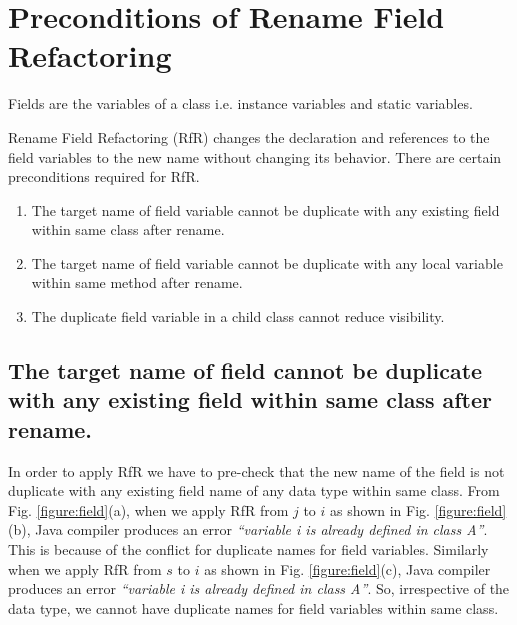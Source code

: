 \section{\textbf{Preconditions of Rename Field Refactoring}}
Fields are the variables of a class i.e. instance variables and static variables.

Rename Field Refactoring (RfR) changes the declaration and references to the field variables to the new name without changing its behavior.
There are certain preconditions required for RfR.

\begin{enumerate}
	\item The target name of field variable cannot be duplicate with any existing field within same class after rename.
	\item The target name of field variable cannot be duplicate with any local variable within same method after rename.
	\item The duplicate field variable in a child class cannot reduce visibility. 
\end{enumerate}

\subsection{The target name of field cannot be duplicate with any existing field within same class after rename.}

In order to apply RfR we have to pre-check that the new name of the field is not duplicate with any existing field name of any data type within same class. From Fig. \ref{figure:field}(a), when we apply RfR from $j$ to $i$ as shown in Fig. \ref{figure:field}(b), Java compiler produces an error \textit{``variable i is already defined in class A''}. This is because of the conflict for duplicate names for field variables. Similarly when we apply RfR from $s$ to $i$ as shown in Fig. \ref{figure:field}(c), Java compiler produces an error \textit{``variable i is already defined in class A''}. So, irrespective of the data type, we cannot have duplicate names for field variables within same class.

